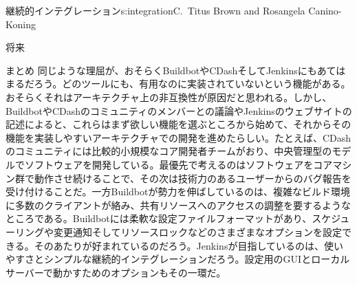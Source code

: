 \begin{aosachapter}{継続的インテグレーション}{s:integration}{C.\ Titus Brown and Rosangela Canino-Koning}
\begin{aosasect1}{将来}
\begin{aosasect2}{まとめ}
同じような理屈が、おそらくBuildbotやCDashそしてJenkinsにもあてはまるだろう。どのツールにも、有用なのに実装されていないという機能がある。おそらくそれはアーキテクチャ上の非互換性が原因だと思われる。しかし、BuildbotやCDashのコミュニティのメンバーとの議論やJenkinsのウェブサイトの記述によると、これらはまず欲しい機能を選ぶところから始めて、それからその機能を実装しやすいアーキテクチャでの開発を進めたらしい。たとえば、CDashのコミュニティには比較的小規模なコア開発者チームがおり、中央管理型のモデルでソフトウェアを開発している。最優先で考えるのはソフトウェアをコアマシン群で動作させ続けることで、その次は技術力のあるユーザーからのバグ報告を受け付けることだ。一方Buildbotが勢力を伸ばしているのは、複雑なビルド環境に多数のクライアントが絡み、共有リソースへのアクセスの調整を要するようなところである。Buildbotには柔軟な設定ファイルフォーマットがあり、スケジューリングや変更通知そしてリソースロックなどのさまざまなオプションを設定できる。そのあたりが好まれているのだろう。Jenkinsが目指しているのは、使いやすさとシンプルな継続的インテグレーションだろう。設定用のGUIとローカルサーバーで動かすためのオプションもその一環だ。


\end{aosasect2}
\end{aosasect1}
\end{aosachapter}

